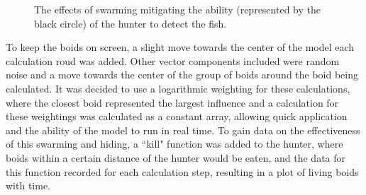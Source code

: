\documentclass[
reprint,
showpacs,preprintnumbers,
amsmath,amssymb,
prl,
]{revtex4-1}
\begin{document}
\begin{figure}[!htp]
		\label{fig:swarming}
		\label{fig:noswarming}
		
	\caption{The effects of swarming mitigating the ability (represented by the black circle) of the hunter to detect the fish.\cite{underwatervision}}

	\label{fig:swarmblindness}
\end{figure}

To keep the boids on screen, a slight move towards the center of the model each calculation roud was added.
Other vector components included were random noise and a move towards the center of the group of boids around the boid being calculated.
It was decided to use a logarithmic weighting for these calculations, where the closest boid represented the largest influence and a calculation for these weightings was calculated as a constant array, allowing quick application and the ability of the model to run in real time.
To gain data on the effectiveness of this swarming and hiding, a ``kill" function was added to the hunter, where boids within a certain distance of the hunter would be eaten, and the data for this function recorded for each calculation step, resulting in a plot of living boids with time.


	
	
\end{document}
